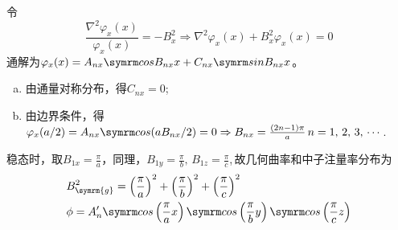 \begin{exercise}
\begin{solution}
        令
        \begin{equation*}
            \frac{\nabla^2\varphi_x(x)}{\varphi_x(x)} = -B_x^2 \Rightarrow \nabla^2\varphi_x(x) + B_x^2\varphi_x(x) = 0
        \end{equation*}
        通解为$\varphi_x(x) = A_{nx}\ncos B_{nx}x + C_{nx}\nsin B_{nx}x$。

        \begin{enumerate}[(a)]
            \item 由通量对称分布，得$C_{nx}=0$;
            \item 由边界条件，得$\varphi_x(a/2) = A_{nx}\ncos(aB_{nx}/2) = 0 \Rightarrow B_{nx} = \frac{(2n-1)\pi}{a}\,n=1,\,2,\,3,\,\cdots$.
        \end{enumerate}

        稳态时，取$B_{1x} = \frac{\pi}{a}$，同理，$B_{1y} = \frac{\pi}{b},\,B_{1z} = \frac{\pi}{c}$,\,故几何曲率和中子注量率分布为
        \begin{align*}
            &B_{\symrm{g}}^2 = \left(\frac{\pi}{a}\right)^2 + \left(\frac{\pi}{b}\right)^2 + \left(\frac{\pi}{c}\right)^2 \\
            &\phi = A'_n \ncos\left(\frac{\pi}{a}x\right) \ncos\left(\frac{\pi}{b}y\right) \ncos\left(\frac{\pi}{c}z\right)
        \end{align*}


\end{solution}
\end{exercise}
